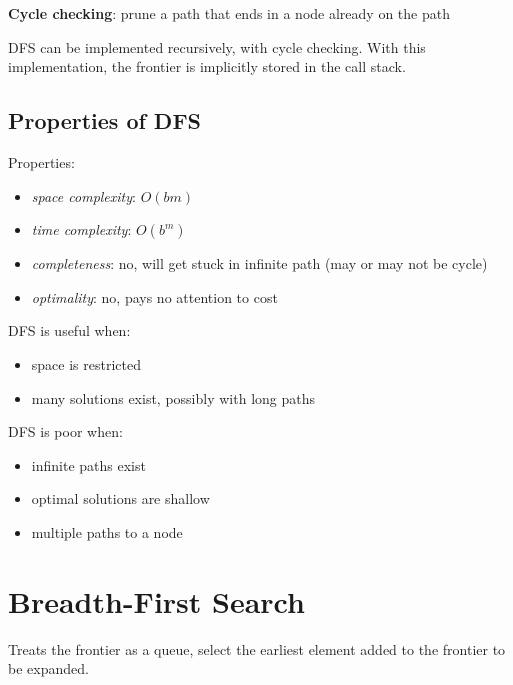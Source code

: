 \documentclass[11pt]{article}
\begin{document}
\textbf{Cycle checking}: prune a path that ends in a node already on the path

DFS can be implemented recursively, with cycle checking.
With this implementation, the frontier is implicitly stored in the call stack.
\subsection{Properties of DFS}
\label{sec:org6c2f232}
Properties:
\begin{itemize}
\item \emph{space complexity}: \(O(bm)\)
\item \emph{time complexity}: \(O(b^{m})\)
\item \emph{completeness}: no, will get stuck in infinite path (may or may not be cycle)
\item \emph{optimality}: no, pays no attention to cost
\end{itemize}

DFS is useful when:
\begin{itemize}
\item space is restricted
\item many solutions exist, possibly with long paths
\end{itemize}

DFS is poor when:
\begin{itemize}
\item infinite paths exist
\item optimal solutions are shallow
\item multiple paths to a node
\end{itemize}
\section{Breadth-First Search}
\label{sec:org37a7d2a}
Treats the frontier as a queue, select the earliest element added to the frontier to be expanded.
\end{document}
